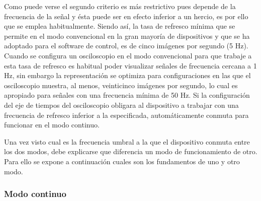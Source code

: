 Como puede verse el segundo criterio es más restrictivo pues depende de la frecuencia de la señal y ésta puede ser en efecto inferior a un hercio, es por ello que se emplea habitualmente. Siendo así, la tasa de refresco mínima que se permite en el modo convencional en la gran mayoría de dispositivos y que se ha adoptado para el software de control, es de cinco imágenes por segundo (5 Hz). Cuando se configura un osciloscopio en el modo convencional para que trabaje a esta tasa de refresco es habitual poder visualizar señales de frecuencia cercana a 1 Hz, sin embargo la representación se optimiza para configuraciones en las que el osciloscopio muestra, al menos, veinticinco imágenes por segundo, lo cual es apropiado para señales con una frecuencia mínima de 50 Hz. Si la configuración del eje de tiempos del osciloscopio obligara al dispositivo a trabajar con una frecuencia de refresco inferior a la especificada, automáticamente conmuta para funcionar en el modo continuo.\par
Una vez visto cual es la frecuencia umbral a la que el dispositivo conmuta entre los dos modos, debe explicarse que diferencia un modo de funcionamiento de otro. Para ello se expone a continuación cuales son los fundamentos de uno y otro modo.


\subsubsection{Modo continuo}

